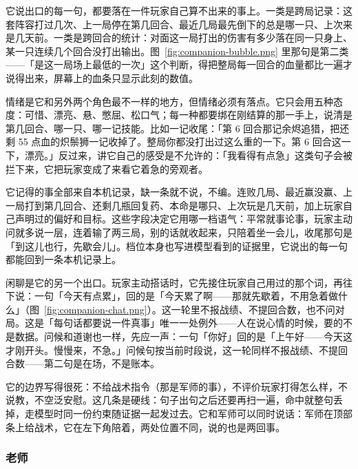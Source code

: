 
它说出口的每一句，都要落在一件玩家自己算不出来的事上。一类是跨局记录：这套阵容打过几次、上一局停在第几回合、最近几局最先倒下的总是哪一只、上次来是几天前。一类是跨回合的统计：对面这一局打出的伤害有多少落在同一只身上、某一只连续几个回合没打出输出。图~\ref{fig:companion-bubble.png} 里那句是第二类——「是这一局场上最低的一次」这个判断，得把整局每一回合的血量都比一遍才说得出来，屏幕上的血条只显示此刻的数值。

情绪是它和另外两个角色最不一样的地方，但情绪必须有落点。它只会用五种态度：可惜、漂亮、悬、憋屈、松口气；每一种都要绑在刚结算的那一手上，说清是第几回合、哪一只、哪一记技能。比如一记收尾：「第 6 回合那记余烬追猎，把还剩 55 点血的炽鬃狮一记收掉了。整局你都没打出过这么重的一下。第 6 回合这一下，漂亮。」反过来，讲它自己的感受是不允许的：「我看得有点急」这类句子会被拦下来，它把玩家变成了来看它着急的旁观者。

它记得的事全部来自本机记录，缺一条就不说，不编。连败几局、最近赢没赢、上一局打到第几回合、还剩几瓶回复药、本命是哪只、上次玩是几天前，加上玩家自己声明过的偏好和目标。这些字段决定它用哪一档语气：平常就事论事，玩家主动问就多说一层，连着输了两三局，别的话就收起来，只陪着坐一会儿，收尾那句是「到这儿也行，先歇会儿」。档位本身也写进模型看到的证据里，它说出的每一句都能回到一条本机记录上。

闲聊是它的另一个出口。玩家主动搭话时，它先接住玩家自己用过的那个词，再往下说：一句「今天有点累」，回的是「今天累了啊——那就先歇着，不用急着做什么」（图~\ref{fig:companion-chat.png}）。这一轮里不报战绩、不提回合数，也不问对局。这是「每句话都要说一件真事」唯一一处例外——人在说心情的时候，要的不是数据。问候和道谢也一样，先应一声：一句「你好」回的是「上午好——今天这才刚开头。慢慢来，不急。」问候句按当前时段说，这一轮同样不报战绩、不提回合数——第二句是在场，不是账本。


它的边界写得很死：不给战术指令（那是军师的事），不评价玩家打得怎么样，不说教，不空泛安慰。这几条是硬线：句子出句之后还要再扫一遍，命中就整句丢掉，走模型时同一份约束随证据一起发过去。它和军师可以同时说话：军师在顶部条上给战术，它在左下角陪着，两处位置不同，说的也是两回事。

\subsubsection{老师}

